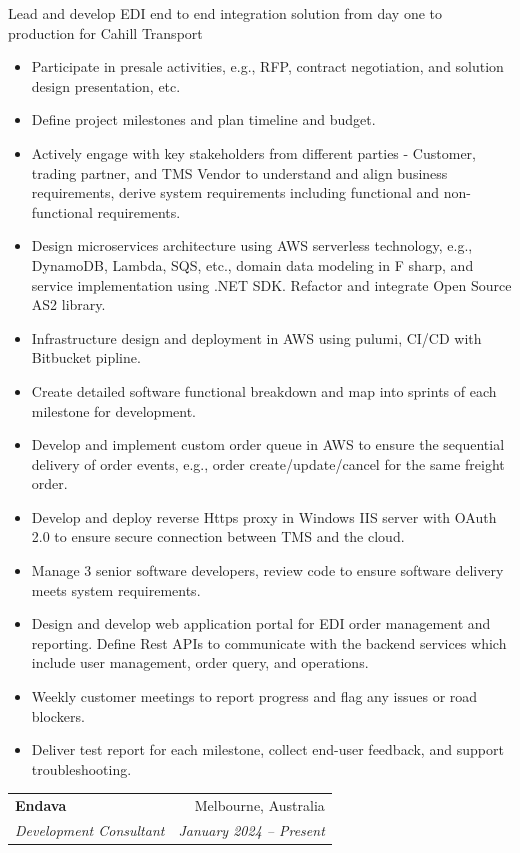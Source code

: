 \documentclass[letterpaper,11pt]{article}
\makeatletter
\newcommand{\resumeItemNoBullet}[4]{
  \vspace{-1pt}
    \begin{tabular*}{0.97\textwidth}{l@{\extracolsep{\fill}}r}
      \textbf{#1} & #2 \\
      \textit{\small#3} & \textit{\small #4} \\
    \end{tabular*}\vspace{-7pt}
}
\newcommand{\resumeSubHeadingListStart}{\begin{itemize}[leftmargin=*]}
\newcommand{\resumeSubHeadingListEnd}{\end{itemize}}
\makeatother
\begin{document}
\vspace{10pt}
{Lead and develop EDI end to end integration solution from day one to production for Cahill Transport}
  \resumeSubHeadingListStart
    \item Participate in presale activities, e.g., RFP, contract negotiation, and solution design presentation, etc.
    \item Define project milestones and plan timeline and budget.
    \item Actively engage with key stakeholders from different parties - Customer, trading partner, and TMS Vendor to understand and align business requirements, derive system requirements including functional and non-functional requirements.
    \item Design microservices architecture using AWS serverless technology, e.g., DynamoDB, Lambda, SQS, etc., domain data modeling in F sharp, and service implementation using .NET SDK. Refactor and integrate Open Source AS2 library.
    \item Infrastructure design and deployment in AWS using pulumi, CI/CD with Bitbucket pipline.
    \item Create detailed software functional breakdown and map into sprints of each milestone for development.
    \item Develop and implement custom order queue in AWS to ensure the sequential delivery of order events, e.g., order create/update/cancel for the same freight order.
    \item Develop and deploy reverse Https proxy in Windows IIS server with OAuth 2.0 to ensure secure connection between TMS and the cloud.
    \item Manage 3 senior software developers, review code to ensure software delivery meets system requirements.
    \item Design and develop web application portal for EDI order management and reporting. Define Rest APIs to communicate with the backend services which include user management, order query, and operations.
    \item Weekly customer meetings to report progress and flag any issues or road blockers.
    \item Deliver test report for each milestone, collect end-user feedback, and support troubleshooting.
  \resumeSubHeadingListEnd

\resumeItemNoBullet
{Endava}{Melbourne, Australia}
{Development Consultant}{January 2024 -- Present}
\end{document}
